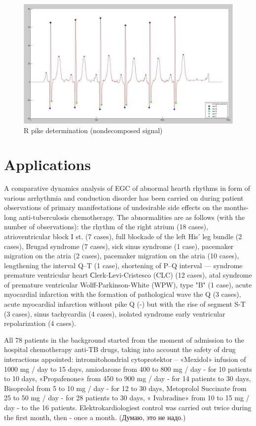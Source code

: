 \documentclass[runningheads]{AIIT}
\newcommand{\nnn}[2][rcolor]{\noindent%
\textcolor{eclr}{}\textcolor{#1}{#2}\textcolor{eclr}{}}
\begin{document}
\begin{figure}[htb]
  \centering
    \includegraphics[width=0.5\linewidth] {images/NonDecomposed.jpg}
  \caption{R pike determination (nondecomposed signal)}
  \label{fig:fig7}
\end{figure}

\section{Applications}
\label{sec:applications}

A comparative dynamics analysis of EGC of abnormal hearth rhythms in form of various arrhythmia and conduction disorder has been carried on during patient observations of primary manifestations of undesirable side effects on the months-long anti-tuberculosis chemotherapy.  The abnormalities are as follows (with the number of observations): the rhythm of the right atrium (18 cases), atrioventricular block I st. (7 cases), full blockade of the left His'  leg bundle (2 cases), Brugad syndrome (7 cases), sick sinus syndrome (1 case), pacemaker migration on the atria (2 cases), pacemaker migration on the atria (10 cases), lengthening the interval Q--T (1 case), shortening of P--Q interval --- syndrome premature ventricular heart Сlerk-Levi-Cristesco (CLC) (12 cases), atal syndrome of premature ventricular Wolff-Parkinson-White (WPW), type "B" (1 case), acute myocardial infarction with the formation of pathological wave the Q (3 cases), acute myocardial infarction without pike Q (-) but with the rise of segment S-T (3 cases), sinus tachycardia (4 cases), isolated syndrome early ventricular repolarization (4 cases).

\nnn{All 78 patients in the background started from the moment of admission to the hospital chemotherapy anti-TB drugs, taking into account the safety of drug interactions appointed: intromitohondrial cytoprotektor – «Mexidol» infusion of 1000 mg / day to 15 days, amiodarone from 400 to 800 mg / day - for 10 patients to 10 days, «Propafenone» from 450 to 900 mg / day - for 14 patients to 30 days, Bisoprolol from 5 to 10 mg / day - for 12 to 30 days, Metoprolol Succinate from 25 to 50 mg / day - for 28 patients to 30 days, « Ivabradine» from 10 to 15 mg / day - to the 16  patients. Elektrokardiologiest control was carried out twice during the first month, then - once a month. (Думаю, это не надо.)}
\end{document}
